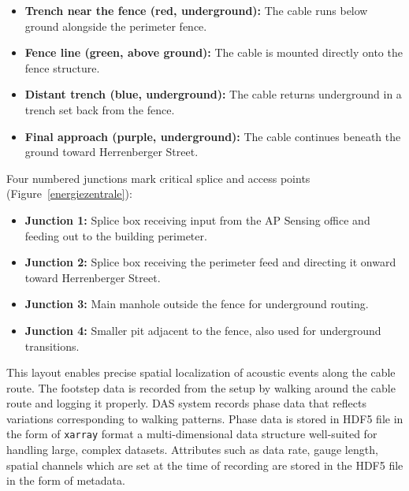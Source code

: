 \begin{itemize}
    \item \textbf{Trench near the fence (red, underground):}  
          The cable runs below ground alongside the perimeter fence.
    \item \textbf{Fence line (green, above ground):}  
          The cable is mounted directly onto the fence structure.
    \item \textbf{Distant trench (blue, underground):}  
          The cable returns underground in a trench set back from the fence.
    \item \textbf{Final approach (purple, underground):}  
          The cable continues beneath the ground toward Herrenberger Street.
\end{itemize}

Four numbered junctions mark critical splice and access points (Figure~\ref{energiezentrale}):

\begin{itemize}
    \item \textbf{Junction 1:} Splice box receiving input from the AP Sensing office and feeding out to the building perimeter.
    \item \textbf{Junction 2:} Splice box receiving the perimeter feed and directing it onward toward Herrenberger Street.
    \item \textbf{Junction 3:} Main manhole outside the fence for underground routing.
    \item \textbf{Junction 4:} Smaller pit adjacent to the fence, also used for underground transitions.
\end{itemize}

This layout enables precise spatial localization of acoustic events along the cable route. The footstep data is recorded from the setup by walking around the cable route and logging it properly. DAS system records phase data that reflects variations corresponding to walking patterns. Phase data is stored in HDF5 file in the form of \texttt{xarray} format a multi-dimensional data structure well-suited for handling large, complex datasets. Attributes such as data rate, gauge length, spatial channels  which are set at the time of recording are stored in the HDF5 file in the form of metadata. 

